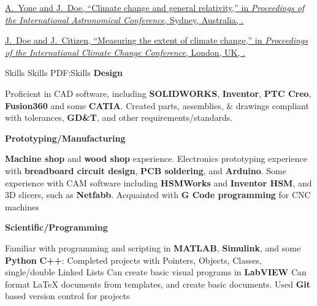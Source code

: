\documentclass[letterpaper,MMMyyyy,nonstopmode]{simpleresumecv}
\begin{document}
\begin{Body}
	\Gap
	\NumberedItem{[100]}
	\href{http://www.example.com/my-paper-doi-2}
	{A.~Yone and \underline{J.~Doe},
	``Climate change and general relativity,''
	in \textit{Proceedings of the International Astronomical Conference},
	Sydney, Australia,
	.}
	
	\Gap
	\NumberedItem{[10]}
	\href{http://www.example.com/my-paper-doi-1}
	{\underline{J.~Doe} and J.~Citizen,
	``Measuring the extent of climate change,''
	in \textit{Proceedings of the International Climate Change Conference},
	London, UK,
	.}
	
	\endgroup
\fi


\Section
{Skills}
{Skills}
{PDF:Skills}
\Entry
\textbf{Design}
\begin{Detail}
\SubBulletItem
Proficient in CAD software, including \textbf{SOLIDWORKS}, \textbf{Inventor}, \textbf{PTC Creo}, \textbf{Fusion360} and some \textbf{CATIA}.
\SubBulletItem 
Created parts, assemblies, \& drawings compliant with tolerances, \textbf{GD\&T}, and other requirements/standards. 
\end{Detail}
\textbf{Prototyping/Manufacturing}
\begin{Detail}
\SubBulletItem
\textbf{Machine shop} and \textbf{wood shop} experience. 
\SubBulletItem
Electronics prototyping experience with \textbf{breadboard circuit design}, \textbf{PCB soldering}, and \textbf{Arduino}.
\SubBulletItem
Some experience with CAM software including \textbf{HSMWorks} and \textbf{Inventor HSM}, and 3D slicers, such as \textbf{Netfabb}.
\SubBulletItem
Acquainted with \textbf{G Code programming} for CNC machines

\end{Detail}

\textbf{Scientific/Programming}
\begin{Detail}
\SubBulletItem
Familiar with programming and scripting in \textbf{MATLAB}, \textbf{Simulink}, and some \textbf{Python}
\SubBulletItem
\textbf{C++}: Completed projects with Pointers, Objects, Classes, single/double Linked Lists
\SubBulletItem
Can create basic visual programs in \textbf{LabVIEW}
\SubBulletItem
Can format {\LaTeX} documents from templates, and create basic documents.
\SubBulletItem
Used \textbf{Git} based version control for projects
\end{Detail}


\end{Body}
\end{document}
